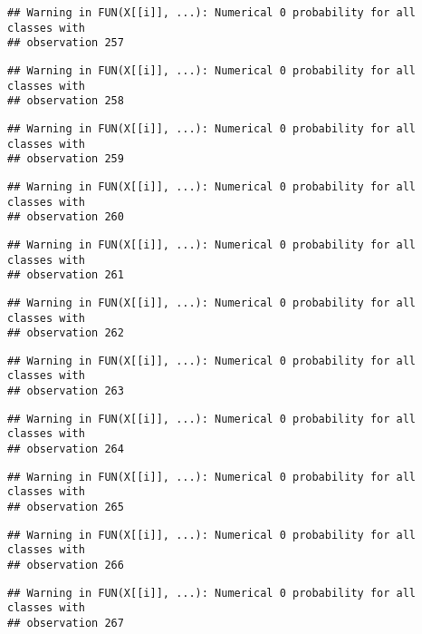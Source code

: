 \documentclass[
]{article}
\begin{document}
\begin{verbatim}
## Warning in FUN(X[[i]], ...): Numerical 0 probability for all classes with
## observation 257
\end{verbatim}

\begin{verbatim}
## Warning in FUN(X[[i]], ...): Numerical 0 probability for all classes with
## observation 258
\end{verbatim}

\begin{verbatim}
## Warning in FUN(X[[i]], ...): Numerical 0 probability for all classes with
## observation 259
\end{verbatim}

\begin{verbatim}
## Warning in FUN(X[[i]], ...): Numerical 0 probability for all classes with
## observation 260
\end{verbatim}

\begin{verbatim}
## Warning in FUN(X[[i]], ...): Numerical 0 probability for all classes with
## observation 261
\end{verbatim}

\begin{verbatim}
## Warning in FUN(X[[i]], ...): Numerical 0 probability for all classes with
## observation 262
\end{verbatim}

\begin{verbatim}
## Warning in FUN(X[[i]], ...): Numerical 0 probability for all classes with
## observation 263
\end{verbatim}

\begin{verbatim}
## Warning in FUN(X[[i]], ...): Numerical 0 probability for all classes with
## observation 264
\end{verbatim}

\begin{verbatim}
## Warning in FUN(X[[i]], ...): Numerical 0 probability for all classes with
## observation 265
\end{verbatim}

\begin{verbatim}
## Warning in FUN(X[[i]], ...): Numerical 0 probability for all classes with
## observation 266
\end{verbatim}

\begin{verbatim}
## Warning in FUN(X[[i]], ...): Numerical 0 probability for all classes with
## observation 267
\end{verbatim}
\end{document}
